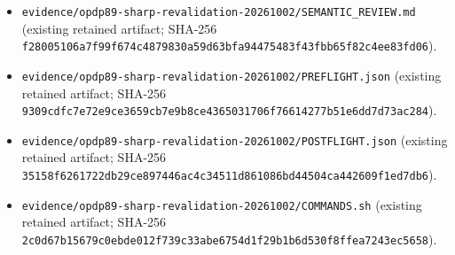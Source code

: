 \documentclass[11pt,a4paper]{article}
\begin{document}
\begin{itemize}
\item \texttt{evidence/opdp89-sharp-revalidation-20261002/SEMANTIC\_REVIEW.md} (existing retained artifact; SHA-256 \texttt{f28005106a7f99f674c4879830a59d63bfa94475483f43fbb65f82c4ee83fd06}).
\end{itemize}
\begin{itemize}
\item \texttt{evidence/opdp89-sharp-revalidation-20261002/PREFLIGHT.json} (existing retained artifact; SHA-256 \texttt{9309cdfc7e72e9ce3659cb7e9b8ce4365031706f76614277b51e6dd7d73ac284}).
\end{itemize}
\begin{itemize}
\item \texttt{evidence/opdp89-sharp-revalidation-20261002/POSTFLIGHT.json} (existing retained artifact; SHA-256 \texttt{35158f6261722db29ce897446ac4c34511d861086bd44504ca442609f1ed7db6}).
\end{itemize}
\begin{itemize}
\item \texttt{evidence/opdp89-sharp-revalidation-20261002/COMMANDS.sh} (existing retained artifact; SHA-256 \texttt{2c0d67b15679c0ebde012f739c33abe6754d1f29b1b6d530f8ffea7243ec5658}).
\end{itemize}
\end{document}
